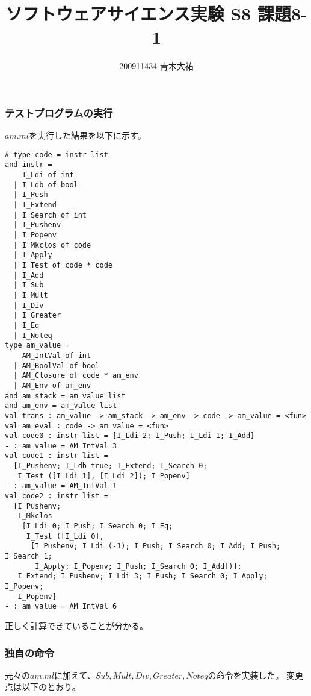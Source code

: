 \documentclass[a4paper,9pt]{jarticle}
\title{ソフトウェアサイエンス実験 S8 課題8-1}
\author{200911434 青木大祐}
\begin{document}
\maketitle
\setcounter{section}{8}
\setcounter{subsection}{1}

\newpage
\subsubsection{テストプログラムの実行}
$am.ml$を実行した結果を以下に示す。
\begin{lstlisting}
# type code = instr list
and instr =
    I_Ldi of int
  | I_Ldb of bool
  | I_Push
  | I_Extend
  | I_Search of int
  | I_Pushenv
  | I_Popenv
  | I_Mkclos of code
  | I_Apply
  | I_Test of code * code
  | I_Add
  | I_Sub
  | I_Mult
  | I_Div
  | I_Greater
  | I_Eq
  | I_Noteq
type am_value =
    AM_IntVal of int
  | AM_BoolVal of bool
  | AM_Closure of code * am_env
  | AM_Env of am_env
and am_stack = am_value list
and am_env = am_value list
val trans : am_value -> am_stack -> am_env -> code -> am_value = <fun>
val am_eval : code -> am_value = <fun>
val code0 : instr list = [I_Ldi 2; I_Push; I_Ldi 1; I_Add]
- : am_value = AM_IntVal 3
val code1 : instr list =
  [I_Pushenv; I_Ldb true; I_Extend; I_Search 0;
   I_Test ([I_Ldi 1], [I_Ldi 2]); I_Popenv]
- : am_value = AM_IntVal 1
val code2 : instr list =
  [I_Pushenv;
   I_Mkclos
    [I_Ldi 0; I_Push; I_Search 0; I_Eq;
     I_Test ([I_Ldi 0],
      [I_Pushenv; I_Ldi (-1); I_Push; I_Search 0; I_Add; I_Push; I_Search 1;
       I_Apply; I_Popenv; I_Push; I_Search 0; I_Add])];
   I_Extend; I_Pushenv; I_Ldi 3; I_Push; I_Search 0; I_Apply; I_Popenv;
   I_Popenv]
- : am_value = AM_IntVal 6
\end{lstlisting}
正しく計算できていることが分かる。
\newpage
\subsubsection{独自の命令}
元々の$am.ml$に加えて、$Sub, Mult, Div, Greater, Noteq$の命令を実装した。
変更点は以下のとおり。
\end{document}
